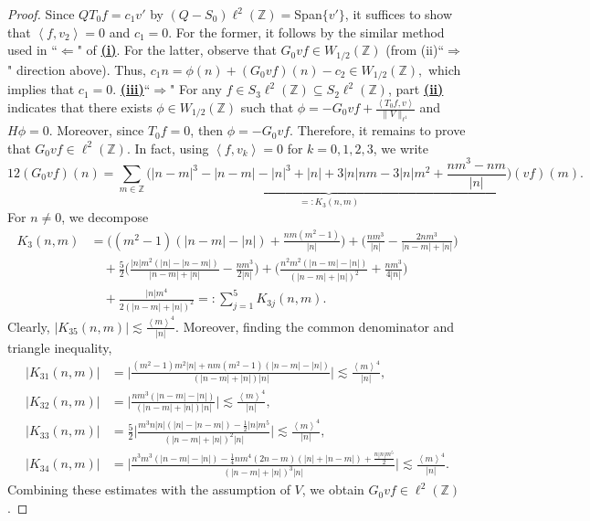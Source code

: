 \documentclass[reqno, 11pt]{amsart}
\newcommand\Z{\mathbb{Z}}
\numberwithin{equation}{section}
\begin{document}
\begin{proof}
Since $QT_0f=c_1v'$ by $(Q-S_0)\ell^2(\Z)=$Span$\{v'\}$, it suffices to show that $\left<f,v_2\right>=0$ and $c_1=0$. For the former, it follows by the similar method used in ``$\bm{\Longleftarrow}$" of {\bf{\underline{(i)}}}. For the latter, observe that $G_0vf\in W_{1/2}(\Z)$ (from (ii)``$\bm{\Longrightarrow}$" direction above). Thus,
$c_1n=\phi(n)+(G_0vf)(n)-c_2\in W_{1/2}(\Z),$
which implies that $c_1=0$.
\vskip0.1cm
{\bf{\underline{(iii)}}}``$\bm{\Longrightarrow}$" For any $f\in S_3\ell^2(\Z)\subseteq S_2\ell^2(\Z)$, part {\bf{\underline{(ii)}}} indicates that there exists $\phi\in W_{1/2}(\Z)$ such that
$\phi=-G_0vf+\frac{\left<T_0f,v\right>}{\|V\|_{\ell^1}}$ and $H\phi=0.$
Moreover, since $T_0f=0$, then $\phi=-G_0vf$. Therefore, it remains to prove that $G_0vf\in\ell^2(\Z)$. In fact, using  $\left<f,v_k\right>=0$ for $k=0,1,2,3$, we write
\begin{equation*}
 12(G_0vf)(n)=\sum\limits_{m\in\Z}^{}\underbrace{\Big(|n-m|^3-|n-m|-|n|^3+|n|+3|n|nm-3|n|m^2+\frac{nm^3-nm}{|n|}\Big)}_{=:K_3(n,m)}(vf)(m).
 \end{equation*}
For $n\neq0$, we decompose 
\begin{align*}
 K_3(n,m)&=\Big((m^2-1)(|n-m|-|n|)+\frac{nm(m^2-1)}{|n|}\Big)+\Big(\frac{nm^3}{|n|}-\frac{2nm^3}{|n-m|+|n|}\Big)\\
 &\quad+\frac{5}{2}\Big(\frac{|n|m^2(|n|-|n-m|)}{|n-m|+|n|}-\frac{nm^3}{2|n|}\Big)+\Big(\frac{n^2m^2(|n-m|-|n|)}{{(|n-m|+|n|)}^2}+\frac{nm^3}{4|n|}\Big)\\
 &\quad+\frac{|n|m^4}{2{(|n-m|+|n|)}^2}=:\sum\limits_{j=1}^{5}K_{3j}(n,m).
 \end{align*}
Clearly, $|K_{35}(n,m)|\lesssim \frac{{\left<m\right>}^4}{|n|}$. Moreover, finding the common denominator and triangle inequality, 
 \begin{align*}
  |K_{31}(n,m)|&=\Big|\frac{(m^2-1)m^2|n|+nm(m^2-1)(|n-m|-|n|)}{(|n-m|+|n|)|n|}\Big|\lesssim \frac{{\left<m\right>}^4}{|n|} ,\\
  |K_{32}(n,m)|&=\Big|\frac{nm^3(|n-m|-|n|)}{(|n-m|+|n|)|n|}\Big|\lesssim\frac{{\left<m\right>}^4}{|n|},\\
  |K_{33}(n,m)|&=\frac{5}{2}\Big|\frac{m^3n|n|(|n|-|n-m|)-\frac{1}{2}|n|m^5}{{(|n-m|+|n|)}^2|n|}\Big|\lesssim\frac{{\left<m\right>}^4}{|n|},\\
  |K_{34}(n,m)|&=\Big|\frac{n^3m^3(|n-m|-|n|)-\frac{1}{4}nm^4(2n-m)(|n|+|n-m|)+\frac{n|n|m^5}{2}}{{(|n-m|+|n|)}^3|n|}\Big|\lesssim\frac{{\left<m\right>}^4}{|n|}.
  \end{align*}
  Combining these estimates with the assumption of $V$, we obtain $G_0vf\in \ell^2(\Z)$.

\end{proof}
\end{document}

